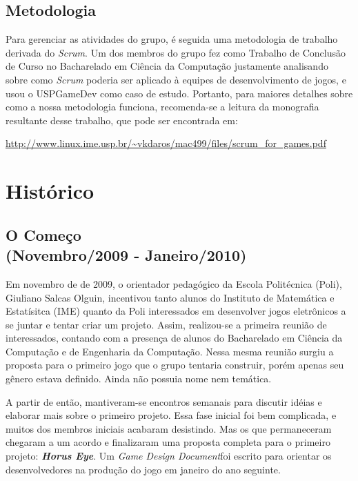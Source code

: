 \documentclass[12pt,onecolumn,a4paper]{article}
\begin{document}
    \subsection{Metodologia}
    \label{sec:metodologia}
        Para gerenciar as atividades do grupo, é seguida uma metodologia de trabalho derivada do
        {\it Scrum}. Um dos membros do grupo fez como Trabalho de Conclusão de Curso no Bacharelado
        em Ciência da Computação justamente analisando sobre como {\it Scrum} poderia ser aplicado à
        equipes de desenvolvimento de jogos, e usou o USPGameDev como caso de estudo. Portanto, para
        maiores detalhes sobre como a nossa metodologia funciona, recomenda-se a leitura da
        monografia resultante desse trabalho, que pode ser encontrada em:
        
        \begin{center}
            \footnotesize
            \url{http://www.linux.ime.usp.br/~vkdaros/mac499/files/scrum_for_games.pdf}
        \end{center}

\section{\LARGE Histórico}
    
    \subsection{O Começo \\ {\small(Novembro/2009 - Janeiro/2010)}}
        Em novembro de de 2009, o orientador pedagógico da Escola Politécnica (Poli), Giuliano
        Salcas Olguin, incentivou tanto alunos do Instituto de Matemática e Estatísitca (IME) quanto
        da Poli interessados em desenvolver jogos eletrônicos a se juntar e tentar criar um projeto.
        Assim, realizou-se a primeira reunião de interessados, contando com a presença de alunos do
        Bacharelado em Ciência da Computação e de Engenharia da Computação. Nessa mesma reunião
        surgiu a proposta para o primeiro jogo que o grupo tentaria construir, porém apenas seu
        gênero estava definido. Ainda não possuia nome nem temática.

        A partir de então, mantiveram-se encontros semanais para discutir idéias e elaborar mais
        sobre o primeiro projeto. Essa fase inicial foi bem complicada, e muitos dos membros
        iniciais acabaram desistindo. Mas os que permaneceram chegaram a um acordo e finalizaram uma
        proposta completa para o primeiro projeto: \textit{\textbf{Horus Eye}}. Um \textit{Game
        Design Document}\footnotemark foi escrito para orientar os desenvolvedores na produção do
        jogo em janeiro do ano seguinte.
        
\end{document}
